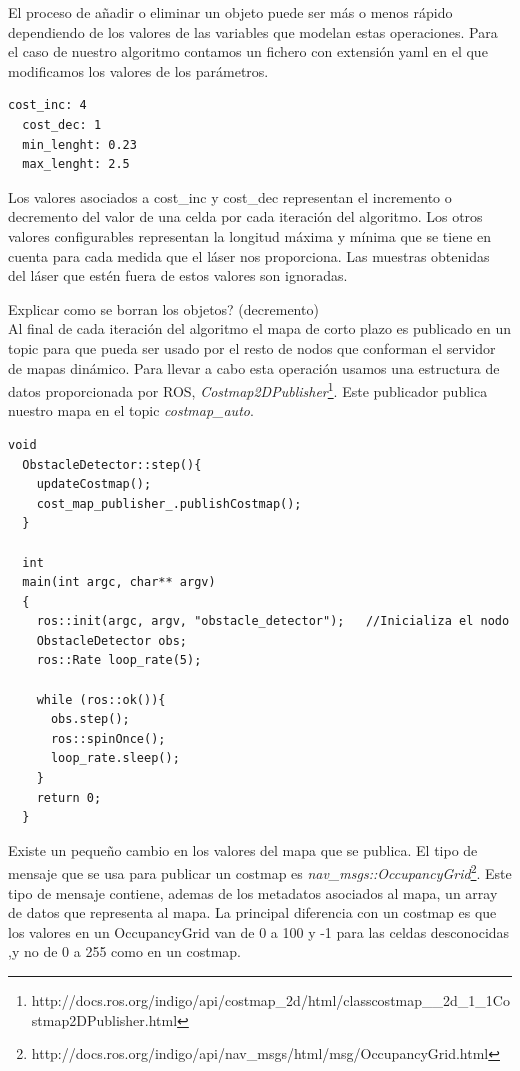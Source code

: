 El proceso de añadir o eliminar un objeto puede ser más o menos rápido dependiendo de los valores de las variables que modelan estas operaciones. Para el caso de nuestro algoritmo contamos un fichero con extensión yaml en el que modificamos los valores de los parámetros.
\renewcommand{\lstlistingname}{Código}
\begin{lstlisting}[caption=Fichero de configuración obstacle\_detector.yaml, label={lst:obstacledetectorconfig}]
  cost_inc: 4
  cost_dec: 1
  min_lenght: 0.23
  max_lenght: 2.5
\end{lstlisting}
Los valores asociados a cost\_inc y cost\_dec representan el incremento o decremento del valor de una celda por cada iteración del algoritmo. Los otros valores configurables representan la longitud máxima y mínima que se tiene en cuenta para cada medida que el láser nos proporciona. Las muestras obtenidas del láser que estén fuera de estos valores son ignoradas.

{Explicar como se borran los objetos? (decremento)}\\

Al final de cada iteración del algoritmo el mapa de corto plazo es publicado en un topic para que pueda ser usado por el resto de nodos que conforman el servidor de mapas dinámico. Para llevar a cabo esta operación usamos una estructura de datos proporcionada por ROS, \textit{Costmap2DPublisher}\footnote{http://docs.ros.org/indigo/api/costmap\_2d/html/classcostmap\_\_2d\_1\_1Costmap2DPublisher.html}. Este publicador publica nuestro mapa en el topic \textit{costmap\_auto}.\pagebreak
\renewcommand{\lstlistingname}{Código}
\begin{lstlisting}[caption=Step del nodo obstacle\_detector, label={lst:stepobstacledetector}]
  void
  ObstacleDetector::step(){
    updateCostmap();
    cost_map_publisher_.publishCostmap();
  }

  int
  main(int argc, char** argv)
  {
    ros::init(argc, argv, "obstacle_detector");   //Inicializa el nodo
    ObstacleDetector obs;
    ros::Rate loop_rate(5);

    while (ros::ok()){
      obs.step();
      ros::spinOnce();
      loop_rate.sleep();
    }
    return 0;
  }

\end{lstlisting}

Existe un pequeño cambio en los valores del mapa que se publica. El tipo de mensaje que se usa para publicar un costmap es \textit{nav\_msgs::OccupancyGrid}\footnote{http://docs.ros.org/indigo/api/nav\_msgs/html/msg/OccupancyGrid.html}. Este tipo de mensaje contiene, ademas de los metadatos asociados al mapa, un array de datos que representa al mapa. La principal diferencia con un costmap es que los valores en un OccupancyGrid van de 0 a 100 y -1 para las celdas desconocidas ,y no de 0 a 255 como en un costmap.

